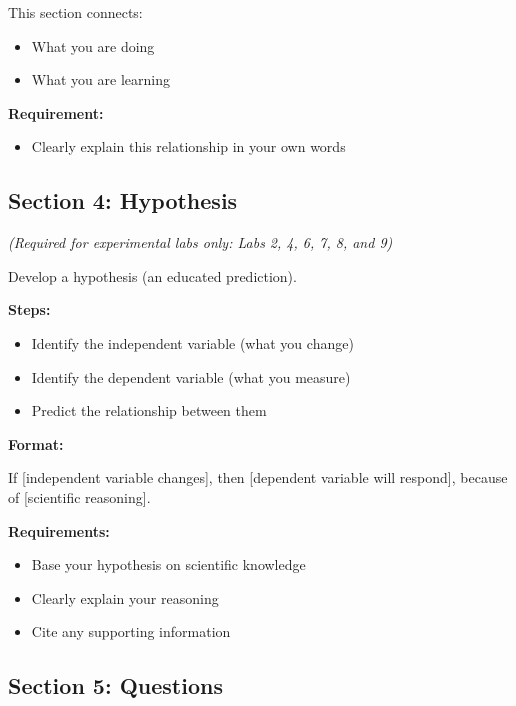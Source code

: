\documentclass[
  letterpaper,
  DIV=11,
  numbers=noendperiod]{scrreprt}
\providecommand{\tightlist}{%
  \setlength{\itemsep}{0pt}\setlength{\parskip}{0pt}}
\begin{document}
This section connects:

\begin{itemize}
\item
  What you are doing
\item
  What you are learning
\end{itemize}

\textbf{Requirement:}

\begin{itemize}
\tightlist
\item
  Clearly explain this relationship in your own words
\end{itemize}

\subsection*{\texorpdfstring{\textbf{Section 4:
Hypothesis}}{Section 4: Hypothesis}}\label{section-4-hypothesis}

\emph{(Required for experimental labs only: Labs 2, 4, 6, 7, 8, and 9)}

Develop a hypothesis (an educated prediction).

\textbf{Steps:}

\begin{itemize}
\item
  Identify the independent variable (what you change)
\item
  Identify the dependent variable (what you measure)
\item
  Predict the relationship between them
\end{itemize}

\textbf{Format:}

If {[}independent variable changes{]}, then {[}dependent variable will
respond{]}, because of {[}scientific reasoning{]}.

\textbf{Requirements:}

\begin{itemize}
\item
  Base your hypothesis on scientific knowledge
\item
  Clearly explain your reasoning
\item
  Cite any supporting information
\end{itemize}

\subsection*{\texorpdfstring{\textbf{Section 5:
Questions}}{Section 5: Questions}}\label{section-5-questions}
\end{document}

